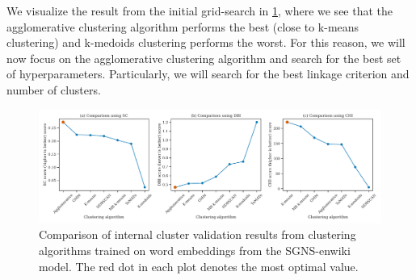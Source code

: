 We visualize the result from the initial grid-search in \cref{fig:cluster-analysis-comparison-internal-cluster-validation}, where we see that the agglomerative clustering algorithm performs the best (close to k-means clustering) and k-medoids clustering performs the worst. For this reason, we will now focus on the agglomerative clustering algorithm and search for the best set of hyperparameters. Particularly, we will search for the best linkage criterion and number of clusters.
\begin{figure}[H]
    \centering
    \includegraphics[width=\textwidth]{thesis/figures/cluster-analysis-comparison-internal-cluster-validation.pdf}
    \caption{Comparison of internal cluster validation results from clustering algorithms trained on word embeddings from the SGNS-enwiki model. The red dot in each plot denotes the most optimal value.}
    \label{fig:cluster-analysis-comparison-internal-cluster-validation}
\end{figure}

